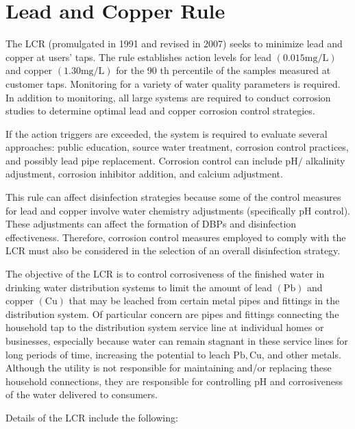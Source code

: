 \documentclass[10pt]{article}
\begin{document}
\section{Lead and Copper Rule}
The LCR (promulgated in 1991 and revised in 2007) seeks to minimize lead and copper at users' taps. The rule establishes action levels for lead $(0.015 \mathrm{mg} / \mathrm{L})$ and copper $(1.30 \mathrm{mg} / \mathrm{L})$ for the 90 th percentile of the samples measured at customer taps. Monitoring for a variety of water quality parameters is required. In addition to monitoring, all large systems are required to conduct corrosion studies to determine optimal lead and copper corrosion control strategies.

If the action triggers are exceeded, the system is required to evaluate several approaches: public education, source water treatment, corrosion control practices, and possibly lead pipe replacement. Corrosion control can include $\mathrm{pH} /$ alkalinity adjustment, corrosion inhibitor addition, and calcium adjustment.

This rule can affect disinfection strategies because some of the control measures for lead and copper involve water chemistry adjustments (specifically $\mathrm{pH}$ control). These adjustments can affect the formation of DBPs and disinfection effectiveness. Therefore, corrosion control measures employed to comply with the LCR must also be considered in the selection of an overall disinfection strategy.

The objective of the LCR is to control corrosiveness of the finished water in drinking water distribution systems to limit the amount of lead $(\mathrm{Pb})$ and copper $(\mathrm{Cu})$ that may be leached from certain metal pipes and fittings in the distribution system. Of particular concern are pipes and fittings connecting the household tap to the distribution system service line at individual homes or businesses, especially because water can remain stagnant in these service lines for long periods of time, increasing the potential to leach $\mathrm{Pb}, \mathrm{Cu}$, and other metals. Although the utility is not responsible for maintaining and/or replacing these household connections, they are responsible for controlling $\mathrm{pH}$ and corrosiveness of the water delivered to consumers.

Details of the LCR include the following:
\end{document}
